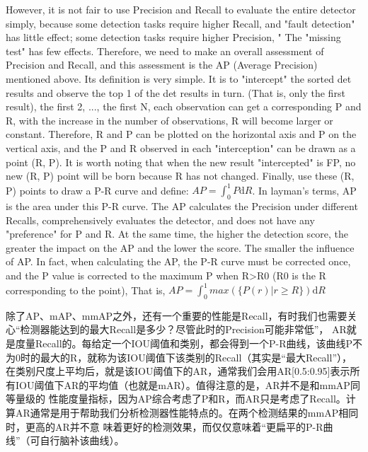 \documentclass[UTF8]{ctexart}
\begin{document}
However, it is not fair to use Precision and Recall to evaluate the entire detector simply, because some detection tasks 
require higher Recall, and "fault detection" has little effect; some detection tasks require higher Precision, " The "missing 
test" has few effects. Therefore, we need to make an overall assessment of Precision and Recall, and this assessment is the AP 
(Average Precision) mentioned above. Its definition is very simple. It is to "intercept" the sorted det results and observe the 
top 1 of the det results in turn. (That is, only the first result), the first 2, ..., the first N, each observation can get a 
corresponding P and R, with the increase in the number of observations, R will become larger or constant. Therefore, R and P 
can be plotted on the horizontal axis and P on the vertical axis, and the P and R observed in each "interception" can be drawn 
as a point (R, P). It is worth noting that when the new result "intercepted" is FP, no new (R, P) point will be born because R 
has not changed. Finally, use these (R, P) points to draw a P-R curve and define: $AP=\int_{0}^{1}P\mathrm{d}R$. In layman's 
terms, AP is the area under this P-R curve. The AP calculates the Precision under different Recalls, comprehensively evaluates 
the detector, and does not have any "preference" for P and R. At the same time, the higher the detection score, the greater the 
impact on the AP and the lower the score. The smaller the influence of AP. In fact, when calculating the AP, the P-R curve must 
be corrected once, and the P value is corrected to the maximum P when R>R0 (R0 is the R corresponding to the point),
That is, $AP=\int_{0}^{1}max(\{P(r)|r \geq R\})\mathrm{d}R$

除了AP、mAP、mmAP之外，还有一个重要的性能是Recall，有时我们也需要关心“检测器能达到的最大Recall是多少？尽管此时的Precision可能非常低”，
AR就是度量Recall的。每给定一个IOU阈值和类别，都会得到一个P-R曲线，该曲线P不为0时的最大的R，就称为该IOU阈值下该类别的Recall（其实是“最大Recall”），
在类别尺度上平均后，就是该IOU阈值下的AR，通常我们会用AR[0.5:0.95]表示所有IOU阈值下AR的平均值（也就是mAR）。值得注意的是，AR并不是和mmAP同等量级的
性能度量指标，因为AP综合考虑了P和R，而AR只是考虑了Recall。计算AR通常是用于帮助我们分析检测器性能特点的。在两个检测结果的mmAP相同时，更高的AR并不意
味着更好的检测效果，而仅仅意味着“更扁平的P-R曲线”（可自行脑补该曲线）。
\end{document}
